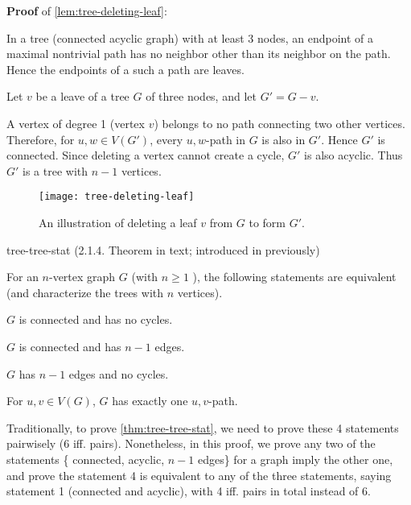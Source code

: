 \documentclass[../src/handouts/main.tex]{subfiles}
\begin{document}
\textbf{Proof} of \cref{lem:tree-deleting-leaf}:
\begin{enumerate*}
  \item {}
  \item In a tree (connected acyclic graph) with at least 3 nodes, an endpoint of a maximal nontrivial path has no neighbor other than its neighbor on the path. Hence the endpoints of a such a path are leaves.
  \item Let $v$ be a leave of a tree $G$ of three nodes, and let $G' = G - v$.
  \item A vertex of degree 1 (vertex $v$) belongs to no path connecting two other vertices. Therefore, for $u, w \in V\left( G' \right)$, every $u,w$-path in $G$ is also in $G'$. Hence $G'$ is connected. Since deleting a vertex cannot create a cycle, $G'$ is also acyclic. Thus $G'$ is a tree with $n - 1$ vertices.
\end{enumerate*}

\begin{figure}[htbp]
  \centering
  \texttt{[image: tree-deleting-leaf]}
  \caption{An illustration of deleting a leaf $v$ from $G$ to form $G'$.}
  \label{fig:tree-deleting-leaf}
\end{figure}

\begin{theorem}{}{tree-tree-stat}
  (2.1.4. Theorem in text; introduced in  previously)

  For an $n$-vertex graph $G$ (with $n \geq 1$ ), the following statements are equivalent (and characterize the trees with $n$ vertices).
  \begin{enumerate*}
    \item $G$ is connected and has no cycles.
    \item $G$ is connected and has $n - 1$ edges.
    \item $G$ has $n - 1$ edges and no cycles.
    \item For $u, v \in V(G)$, $G$ has exactly one $u,v$-path.
  \end{enumerate*}
\end{theorem}

Traditionally, to prove \cref{thm:tree-tree-stat}, we need to prove these 4 statements pairwisely (6 iff. pairs). Nonetheless, in this proof, we prove any two of the statements \{ connected, acyclic, $n - 1$ edges\} for a graph imply the other one, and prove the statement 4 is equivalent to any of the three statements, saying statement 1 (connected and acyclic), with 4 iff. pairs in total instead of 6.
\end{document}
